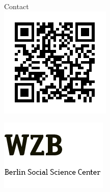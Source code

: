 \documentclass[landscape,paperheight=24in,fontscale=.45,paperwidth=36in]{baposter}
\begin{document}
\begin{poster}
{\begin{minipage}{.29\linewidth}
  \end{minipage}
  \hfill
  \begin{minipage}{.29\linewidth}
    \centering
    {\sf Contact} \\
    \includegraphics[scale=.18]{qrcodeWzb.png}
  \end{minipage}
  \hfill
  \begin{minipage}{.38\linewidth}
    \centering
    \includegraphics[scale=.4]{logo_en.png}
  \end{minipage}
}
\end{poster}
\end{document}

